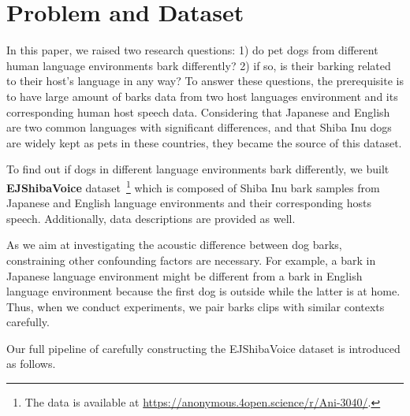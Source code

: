 \section{Problem and Dataset}
\label{sec:assumption}
In this paper, we raised two research questions: 1) do pet dogs from different human language environments bark differently? 2) if so, is their barking related to their host's language in any way? To answer these questions, the prerequisite is to have large amount of barks data from two host languages environment and its corresponding human host speech data.
Considering that Japanese and English are two common languages with significant
differences, and that Shiba Inu dogs are widely kept as pets in these 
countries, they became the source of this dataset.

To find out if dogs in different language environments bark differently, 
we built \textbf{EJShibaVoice} 
dataset~\footnote{The data is available at \url{https://anonymous.4open.science/r/Ani-3040/}.} which is 
composed of Shiba Inu bark samples from Japanese and English language environments and their corresponding hosts speech. Additionally, data descriptions are provided as well. 

As we aim at investigating the acoustic difference between dog barks, constraining other confounding factors are necessary. For example, a bark in Japanese language environment might be different from a bark in English language environment because the first dog is outside while the latter is at home. Thus, when we conduct experiments, we pair barks clips with similar contexts carefully.


Our full pipeline of carefully constructing the EJShibaVoice dataset is introduced as follows. 
 
